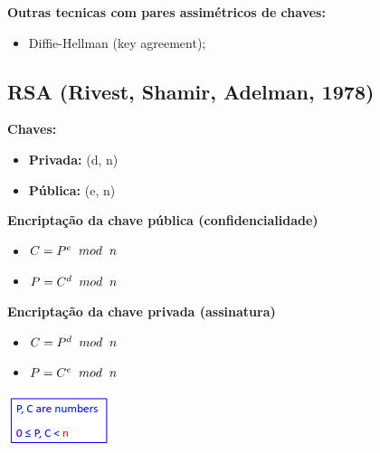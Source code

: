 \documentclass{article}
\begin{document}
\begin{flushleft}
  \vspace{2mm}

  \textbf{Outras tecnicas com pares assimétricos de chaves:}
  \begin{itemize}
    \item Diffie-Hellman (key agreement);
  \end{itemize}
\end{flushleft}

\pagebreak

\subsection{RSA (Rivest, Shamir, Adelman, 1978)}

\begin{flushleft}
  \textbf{Chaves:}
  \begin{itemize}
    \item \textbf{Privada:} (d, n)
    \item \textbf{Pública:} (e, n)
  \end{itemize}

  \vspace{2mm}

  \textbf{Encriptação da chave pública (confidencialidade)}
  \begin{itemize}
    \item $C = P^e \hspace{2mm} mod \hspace{2mm} n$
    \item $P = C^d \hspace{2mm} mod \hspace{2mm} n$
  \end{itemize}

  \vspace{2mm}

  \textbf{Encriptação da chave privada (assinatura)}
  \begin{itemize}
    \item $C = P^d \hspace{2mm} mod \hspace{2mm} n$
    \item $P = C^e \hspace{2mm} mod \hspace{2mm} n$
  \end{itemize}

  \begin{center}
    \includegraphics[scale=0.6]{3}
  \end{center}


\end{flushleft}
\end{document}
